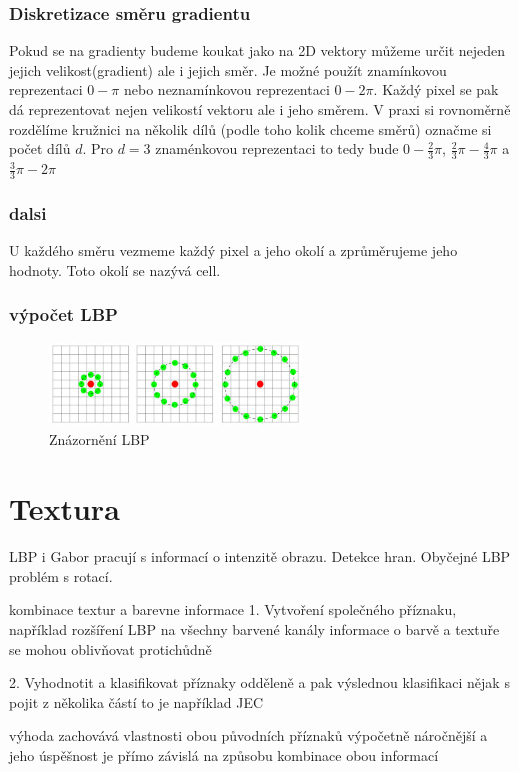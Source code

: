 \documentclass{report}
\begin{document}
\subsubsection{Diskretizace směru gradientu}
Pokud se na gradienty budeme koukat jako na 2D vektory můžeme určit nejeden jejich velikost(gradient) ale i jejich směr. Je možné použít znamínkovou reprezentaci $0 - \pi$ nebo neznamínkovou reprezentaci $0 - 2\pi$. Každý pixel se pak dá reprezentovat nejen velikostí vektoru ale i jeho směrem. V praxi si rovnoměrně rozdělíme kružnici na několik dílů (podle toho kolik chceme směrů) označme si počet dílů $d$. Pro $d = 3$ znaménkovou reprezentaci to tedy bude $0 - \frac{2}{3}\pi$, $\frac{2}{3}\pi - \frac{4}{3}\pi$ a $\frac{3}{3}\pi - 2\pi$ 

\subsubsection{dalsi}
U každého směru vezmeme každý pixel a jeho okolí a zprůměrujeme jeho hodnoty. Toto okolí se nazývá cell. 

\subsubsection{výpočet LBP}


\begin{figure}[ht]
		\centering
		\includegraphics[width=253px]{./img/poem.png}	
		\caption{Znázornění LBP}
\end{figure} 
 
\section{Textura}
LBP i Gabor pracují s informací o intenzitě obrazu. Detekce hran. Obyčejné LBP problém s rotací.

kombinace textur a barevne informace
1. Vytvoření společného příznaku, 
například rozšíření LBP na všechny barvené kanály
informace o barvě a textuře se mohou oblivňovat protichůdně

2. Vyhodnotit a klasifikovat příznaky odděleně a pak výslednou klasifikaci nějak s pojit z několika částí 
	to je například JEC
	
	výhoda zachovává vlastnosti obou původních příznaků 
	výpočetně náročnější a jeho úspěšnost je přímo závislá na způsobu kombinace obou informací	
	
\end{document}

